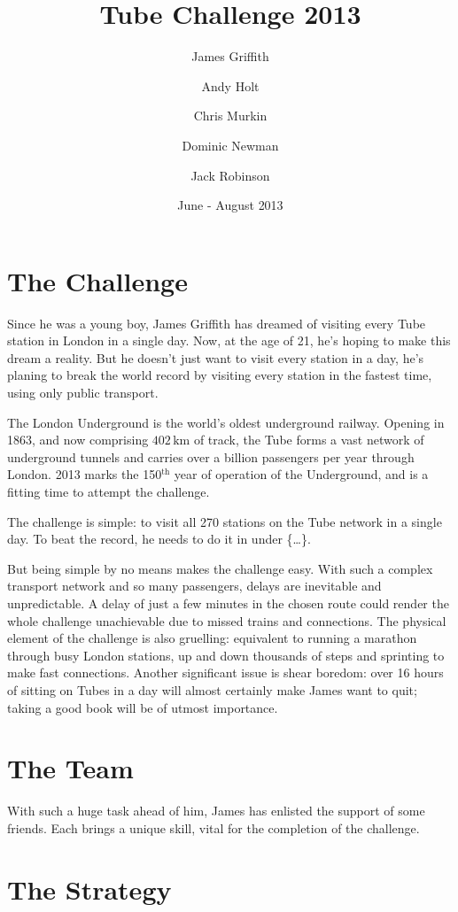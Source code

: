 \documentclass[a4paper,11pt]{article}  %
\title{Tube Challenge 2013}
\author{James Griffith \and Andy Holt \and Chris Murkin \and Dominic
  Newman \and Jack Robinson}
\date{June - August 2013}
\begin{document}
\maketitle

\section*{The Challenge}

Since he was a young boy, James Griffith has dreamed of visiting every
Tube station in London in a single day. Now, at the age of 21, he's
hoping to make this dream a reality. But he doesn't just want to visit
every station in a day, he's planing to break the world record by
visiting every station in the fastest time, using only public
transport.

The London Underground is the world's oldest underground
railway. Opening in 1863, and now comprising $402\,\mathrm{km}$ of
track, the Tube forms a vast network of underground tunnels and
carries over a billion passengers per year through London. 2013 marks
the 150$^{\mathrm{th}}$ year of operation of the Underground, and is a
fitting time to attempt the challenge.

The challenge is simple: to visit all 270 stations on the Tube network
in a single day. To beat the record, he needs to do it in
under \{\ldots\}.

But being simple by no means makes the challenge easy. With such a
complex transport network and so many passengers, delays are
inevitable and unpredictable. A delay of just a few minutes in the
chosen route could render the whole challenge unachievable due to
missed trains and connections. The physical element of the challenge
is also gruelling: equivalent to running a marathon through busy
London stations, up and down thousands of steps and sprinting to make
fast connections. Another significant issue is shear boredom: over 16
hours of sitting on Tubes in a day will almost certainly make James
want to quit; taking a good book will be of utmost importance.

\section*{The Team}

With such a huge task ahead of him, James has enlisted the support of
some friends. Each brings a unique skill, vital for the completion of
the challenge.

\section*{The Strategy}
\end{document}
